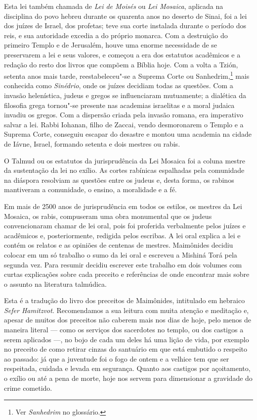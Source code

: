 Esta lei também chamada de \emph{Lei de Moisés} ou \emph{Lei Mosaica}, aplicada na disciplina do povo hebreu durante os quarenta anos no deserto de Sinai,
foi a lei dos juízes de Israel, dos profetas; teve sua corte instalada
durante o período dos reis,
e sua autoridade excedia a do próprio monarca. Com a destruição do
primeiro Templo e de Jerusalém, houve uma enorme necessidade de se
preservarem a lei e seus valores, e começou a era dos estatutos
acadêmicos e a redação do resto dos livros que compõem a Bíblia hoje.
Com a volta a Tzión, setenta anos mais tarde, reestabeleceu"-se a Suprema
Corte ou Sanhedrim,\footnote{Ver \emph{Sanhedrim} no glossário.} mais conhecida como \emph{Sinédrio}, onde os juízes
decidiam todas as questões. Com a invasão helenística, judeus e gregos
se influenciaram mutuamente; a dialética da filosofia grega tornou"-se
presente nas academias israelitas e a moral judaica invadiu os gregos.
Com a dispersão criada pela invasão romana, era imperativo salvar a lei.
Rabbi Iohanan, filho de Zaccai, vendo desmoronarem o Templo e a Suprema
Corte, conseguiu escapar do desastre e montou uma academia na cidade de Iávne,
Israel, formando setenta e dois mestres ou rabis.

O Talmud ou os estatutos da jurisprudência da Lei Mosaica foi a coluna
mestre da sustentação da lei no exílio. As cortes rabínicas espalhadas
pela comunidade na diáspora resolviam as questões entre os judeus e,
desta forma, os rabinos mantiveram a comunidade, o ensino, a moralidade
e a fé.

Em mais de 2500 anos de jurisprudência em todos os estilos, os mestres
da Lei Mosaica, os rabis, compuseram uma obra monumental que os judeus
convencionaram chamar de lei oral, pois foi proferida verbalmente
pelos juízes e acadêmicos e, posteriormente, redigida pelos escribas. A
lei oral explica a lei e contém os relatos e as opiniões de centenas de
mestres. Maimônides decidiu colocar em um só trabalho o sumo da lei oral e
escreveu a Mishiná Torá pela segunda vez.
Para resumir decidiu escrever este trabalho em dois volumes com curtas
explicações sobre cada preceito e referências de onde encontrar mais
sobre o assunto na literatura talmúdica.

Esta é a tradução do livro dos preceitos de Maimônides, intitulado em
hebraico \emph{Sefer Hamitzvot}. Recomendamos a sua leitura com muita
atenção e meditação e, apesar de muitos dos preceitos não caberem mais
nos dias de hoje, pelo menos de maneira literal --- como os serviços dos
sacerdotes no templo, ou dos castigos a serem aplicados ---, no bojo de
cada um deles há uma lição de vida, por exemplo no preceito de como retirar
cinzas do santuário em que está embutido o respeito ao passado: já que a
juventude foi o fogo de ontem e a velhice tem que ser respeitada,
cuidada e levada em segurança. Quanto aos castigos por açoitamento, o
exílio ou até a pena de morte, hoje nos servem para dimensionar a
gravidade do crime cometido.

